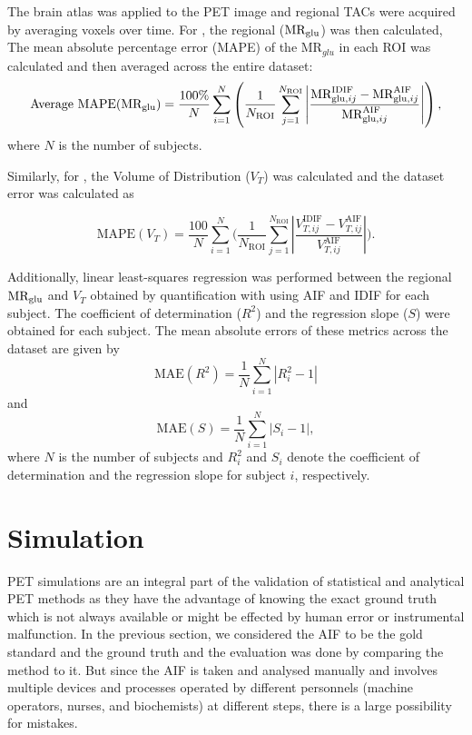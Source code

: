 The brain atlas was applied to the PET image and regional TACs were acquired by averaging voxels over time.
For \fdg, the regional ($\text{MR}_{\text{glu}}$) was then calculated,
The mean absolute percentage error (MAPE) of the \(\textrm{MR}_{glu}\) in each ROI was calculated and then averaged across the entire dataset:
\begin{equation}
	\text{Average MAPE}(\text{MR}_{\text{glu}})= \frac{100\%}{N} \sum_{i=1}^{N} \left( \frac{1}{N_{\text{ROI}}} \sum_{j=1}^{N_{\text{ROI}}} \left| \frac{\textrm{MR}_{\textrm{glu},ij}^{\textrm{IDIF}} - \textrm{MR}_{\textrm{glu},ij}^{\textrm{AIF}}}{\textrm{MR}_{\textrm{glu},ij}^{\textrm{AIF}}} \right| \right),
\end{equation}
where $N$ is the number of subjects.

Similarly, for \yohimbine, the Volume of Distribution ($V_T$) was calculated and the dataset error was calculated as

\begin{equation}
	\mathrm{MAPE}(V_T)
	= \frac{100}{N}
	\sum_{i=1}^{N}
	\biggl(
	\frac{1}{N_{\mathrm{ROI}}}
	\sum_{j=1}^{N_{\mathrm{ROI}}}
	\left|
	\frac{V_{T,ij}^{\mathrm{IDIF}} - V_{T,ij}^{\mathrm{AIF}}}
	{V_{T,ij}^{\mathrm{AIF}}}
	\right|
	\biggr).
\end{equation}

Additionally, linear least-squares regression was performed between the regional \(\text{MR}_{\text{glu}}\) and $V_T$ obtained by quantification with using AIF and IDIF for each subject. The coefficient of determination (\(R^2\)) and the regression slope (\(S\)) were obtained for each subject. The mean absolute errors of these metrics across the dataset are given by
\begin{equation}
	\text{MAE}(R^2) = \frac{1}{N} \sum_{i=1}^{N} \left| R^2_i - 1 \right|
\end{equation}
and
\begin{equation}
	\text{MAE}(S) = \frac{1}{N} \sum_{i=1}^{N} \left| S_i - 1 \right|,
\end{equation}
where $N$ is the number of subjects and \(R^2_i\) and \(S_i\) denote the coefficient of determination and the regression slope for subject \(i\), respectively.

\section{Simulation}
PET simulations are an integral part of the validation of statistical and analytical PET methods as they have the advantage of knowing the exact ground truth which is not always available or might be effected by human error or instrumental malfunction.
In the previous section, we considered the AIF to be the gold standard and the ground truth and the evaluation was done by comparing the method to it.
But since the AIF is taken and analysed manually and involves multiple devices and processes operated by different personnels (machine operators, nurses, and biochemists) at different steps, there is a large possibility for mistakes.

